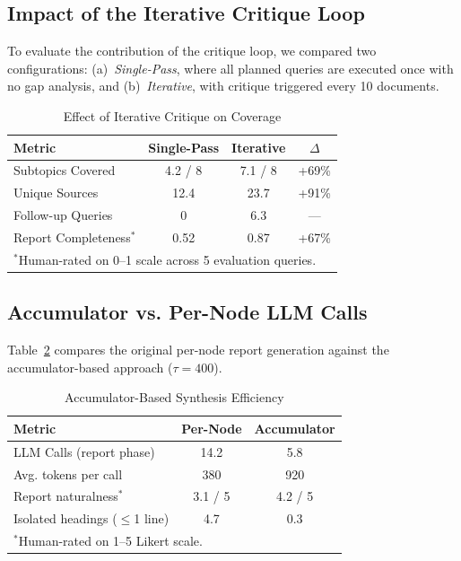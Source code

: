 \documentclass[conference]{IEEEtran}
\begin{document}
\subsection{Impact of the Iterative Critique Loop}

To evaluate the contribution of the critique loop, we compared two configurations: (a)~\textit{Single-Pass}, where all planned queries are executed once with no gap analysis, and (b)~\textit{Iterative}, with critique triggered every 10 documents.

\begin{table}[htbp]
\caption{Effect of Iterative Critique on Coverage}
\label{tab:critique_eval}
\centering
\scriptsize
\begin{tabular}{@{}lccc@{}}
\toprule
\textbf{Metric} & \textbf{Single-Pass} & \textbf{Iterative} & \textbf{$\Delta$} \\
\midrule
Subtopics Covered & 4.2 / 8 & 7.1 / 8 & +69\% \\
Unique Sources & 12.4 & 23.7 & +91\% \\
Follow-up Queries & 0 & 6.3 & --- \\
Report Completeness$^*$ & 0.52 & 0.87 & +67\% \\
\bottomrule
\multicolumn{4}{l}{\scriptsize $^*$Human-rated on 0--1 scale across 5 evaluation queries.}
\end{tabular}
\end{table}

\subsection{Accumulator vs. Per-Node LLM Calls}

Table~\ref{tab:accumulator} compares the original per-node report generation against the accumulator-based approach ($\tau = 400$).

\begin{table}[htbp]
\caption{Accumulator-Based Synthesis Efficiency}
\label{tab:accumulator}
\centering
\scriptsize
\begin{tabular}{@{}lcc@{}}
\toprule
\textbf{Metric} & \textbf{Per-Node} & \textbf{Accumulator} \\
\midrule
LLM Calls (report phase) & 14.2 & 5.8 \\
Avg. tokens per call & 380 & 920 \\
Report naturalness$^*$ & 3.1 / 5 & 4.2 / 5 \\
Isolated headings ($\leq$1 line) & 4.7 & 0.3 \\
\bottomrule
\multicolumn{3}{l}{\scriptsize $^*$Human-rated on 1--5 Likert scale.}
\end{tabular}
\end{table}
\end{document}
